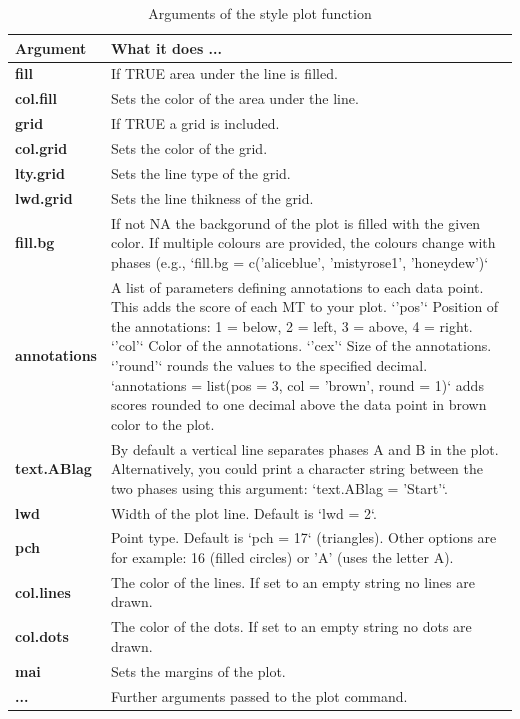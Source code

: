 \documentclass[
]{book}
\begin{document}
\begin{table}

\caption{\label{tab:table-style}Arguments of the style plot function}
\begin{tabular}[t]{>{\raggedright\arraybackslash}p{15em}>{\raggedright\arraybackslash}p{30em}}
\toprule
Argument & What it does ...\\
\midrule
\textbf{fill} & If TRUE area under the line is filled.\\
\textbf{col.fill} & Sets the color of the area under the line.\\
\textbf{grid} & If TRUE a grid is included.\\
\textbf{col.grid} & Sets the color of the grid.\\
\textbf{lty.grid} & Sets the line type of the grid.\\
\textbf{lwd.grid} & Sets the line thikness of the grid.\\
\textbf{fill.bg} & If not NA the backgorund of the plot is filled with the given color. If multiple colours are provided, the colours change with phases (e.g., `fill.bg = c('aliceblue', 'mistyrose1', 'honeydew')`\\
\textbf{annotations} & A list of parameters defining annotations to each data point. This adds the score of each MT to your plot. `'pos'` Position of the annotations: 1 = below, 2 = left, 3 = above, 4 = right. `'col'` Color of the annotations. `'cex'` Size of the annotations. `'round'` rounds the values to the specified decimal. `annotations = list(pos = 3, col = 'brown', round = 1)` adds scores rounded to one decimal above the data point in brown color to the plot.\\
\textbf{text.ABlag} & By default a vertical line separates phases A and B in the plot. Alternatively, you could print a character string between the two phases using this argument: `text.ABlag = 'Start'`.\\
\textbf{lwd} & Width of the plot line. Default is `lwd = 2`.\\
\textbf{pch} & Point type. Default is `pch = 17` (triangles). Other options are for example: 16 (filled circles) or 'A' (uses the letter A).\\
\textbf{col.lines} & The color of the lines. If set to an empty string no lines are drawn.\\
\textbf{col.dots} & The color of the dots. If set to an empty string no dots are drawn.\\
\textbf{mai} & Sets the margins of the plot.\\
\textbf{...} & Further arguments passed to the plot command.\\
\bottomrule
\end{tabular}
\end{table}
\end{document}
